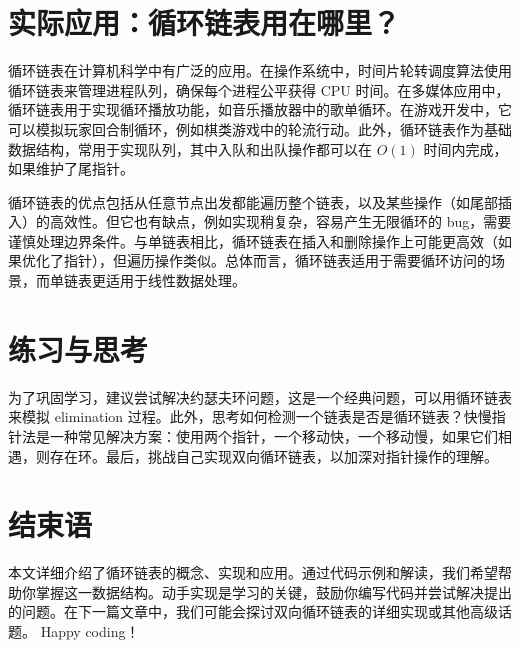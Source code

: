 \chapter{实际应用：循环链表用在哪里？}
循环链表在计算机科学中有广泛的应用。在操作系统中，时间片轮转调度算法使用循环链表来管理进程队列，确保每个进程公平获得 CPU 时间。在多媒体应用中，循环链表用于实现循环播放功能，如音乐播放器中的歌单循环。在游戏开发中，它可以模拟玩家回合制循环，例如棋类游戏中的轮流行动。此外，循环链表作为基础数据结构，常用于实现队列，其中入队和出队操作都可以在 $O(1)$ 时间内完成，如果维护了尾指针。\par
循环链表的优点包括从任意节点出发都能遍历整个链表，以及某些操作（如尾部插入）的高效性。但它也有缺点，例如实现稍复杂，容易产生无限循环的 bug，需要谨慎处理边界条件。与单链表相比，循环链表在插入和删除操作上可能更高效（如果优化了指针），但遍历操作类似。总体而言，循环链表适用于需要循环访问的场景，而单链表更适用于线性数据处理。\par
\chapter{练习与思考}
为了巩固学习，建议尝试解决约瑟夫环问题，这是一个经典问题，可以用循环链表来模拟 elimination 过程。此外，思考如何检测一个链表是否是循环链表？快慢指针法是一种常见解决方案：使用两个指针，一个移动快，一个移动慢，如果它们相遇，则存在环。最后，挑战自己实现双向循环链表，以加深对指针操作的理解。\par
\chapter{结束语}
本文详细介绍了循环链表的概念、实现和应用。通过代码示例和解读，我们希望帮助你掌握这一数据结构。动手实现是学习的关键，鼓励你编写代码并尝试解决提出的问题。在下一篇文章中，我们可能会探讨双向循环链表的详细实现或其他高级话题。 Happy coding！\par
